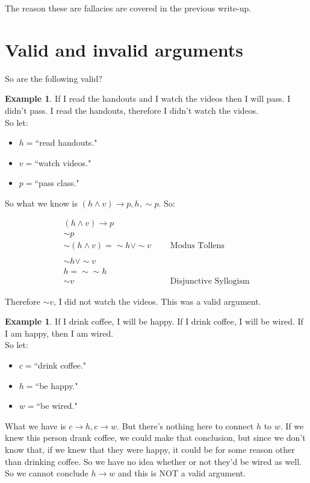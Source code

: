 \documentclass[10pt]{article}
\theoremstyle{definition}
\newtheorem{example}[equation]{Example}
\begin{document}
The reason these are fallacies are covered in the previous write-up.


\section{Valid and invalid arguments}

So are the following valid?

\begin{example}
If I read the handouts and I watch the videos  then I will pass.  I didn't pass. I read the handouts, therefore I didn't watch the videos.\\

So let:

\begin{itemize}
\item $h=$``read handouts."
\item $v=$``watch videos."
\item $p=$``pass class."
\end{itemize}

So what we know is $(h\wedge v)\to p, h, \sim p.$  So:

$$\begin{array}{lcl}
(h\wedge v)\to p&\ \ \ &\\
\sim p\\
\hline
\sim(h\wedge v)=\sim h \vee\sim v & &\text{Modus Tollens}\\
 \\
\sim h \vee \sim v \\
h=\sim \sim h\\
\hline
\sim v  & &\text{Disjunctive Syllogism}
\end{array}$$

Therefore $\sim v$, I did not watch the videos.  This was a valid argument.


\end{example}


\begin{example}
If I drink coffee, I will be happy.  If I drink coffee, I will be wired.  If I am happy, then I am wired.\\

So let:

\begin{itemize}
\item $c=$``drink coffee."
\item $h=$``be happy."
\item $w=$``be wired."
\end{itemize}

What we have is $c\to h, c\to w$.  But there's nothing here to connect $h$ to $w$.  If we knew this person drank coffee, we could make that conclusion, but since we don't know that, if we knew that they were happy, it could be for some reason other than drinking coffee.  So we have no idea whether or not they'd be wired as well.  So we cannot conclude $h \to w$ and this is NOT a valid argument.


\end{example}
\end{document}
